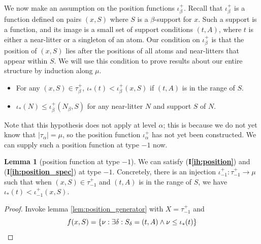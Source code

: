 \documentclass{article}
\theoremstyle{definition}
\newtheorem{lemma}[theorem]{Lemma}
\theoremstyle{remark}
\newcommand{\ihref}[1]{(\textbf{I\ref{#1}})}
\begin{document}
{

We now make an assumption on the position functions $\iota_\beta^+$.
Recall that $\iota_\beta^+$ is a function defined on pairs $(x, S)$ where $S$ is a $\beta$-support for $x$.
Such a support is a function, and its image is a small set of support conditions $(t, A)$, where $t$ is either a near-litter or a singleton of an atom.
Our condition on $\iota_\beta^+$ is that the position of $(x, S)$ lies after the positions of all atoms and near-litters that appear within $S$.
We will use this condition to prove results about our entire structure by induction along $\mu$.


\begin{itemize}

\item For any $(x,S) \in \tau_\beta^+$, $\iota_*(t) < \iota^+_\beta(x,S)$ if $(t,A)$ is in the range of $S$.

\item $\iota_*(N) \leq \iota^+_\beta(N_\beta,S)$ for any near-litter $N$ and support $S$ of $N$.

\end{itemize}

Note that this hypothesis does not apply at level $\alpha$; this is because we do not yet know that $|\tau_\alpha| = \mu$, so the position function $\iota_\alpha^+$ has not yet been constructed.
We can supply such a position function at type $-1$ now.
\begin{lemma}[position function at type $-1$]
  We can satisfy \ihref{ih:position} and \ihref{ih:position_spec} at type $-1$.
  Concretely, there is an injection $\iota_{-1}^+ : \tau_{-1}^+ \to \mu$ such that when $(x, S) \in \tau_{-1}^+$ and $(t, A)$ is in the range of $S$, we have $\iota_*(t) < \iota_{-1}^+(x, S)$.
\end{lemma}
\begin{proof}
  Invoke lemma \ref{lem:position_generator} with $X = \tau_{-1}^+$ and
  $$ f(x, S) = \{ \nu : \exists \delta : S_\delta = (t, A) \wedge \nu \leq \iota_*(t) \} \qedhere $$
\end{proof}

}
\end{document}
